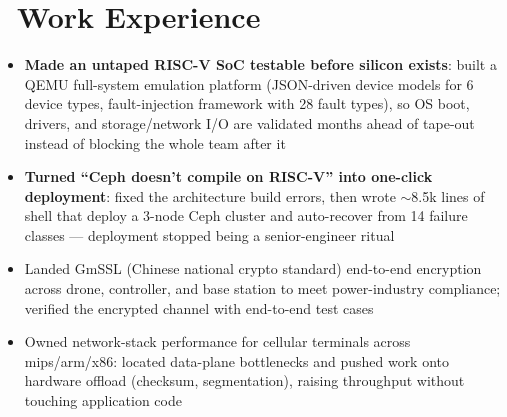 \documentclass{resume}
\begin{document}
\section{\faBriefcase\ Work Experience}
\begin{onehalfspacing}
\begin{itemize}
	\item \textbf{Made an untaped RISC-V SoC testable before silicon exists}: built a QEMU full-system emulation platform (JSON-driven device models for 6 device types, fault-injection framework with 28 fault types), so OS boot, drivers, and storage/network I/O are validated months ahead of tape-out instead of blocking the whole team after it
	\item \textbf{Turned ``Ceph doesn't compile on RISC-V'' into one-click deployment}: fixed the architecture build errors, then wrote $\sim$8.5k lines of shell that deploy a 3-node Ceph cluster and auto-recover from 14 failure classes --- deployment stopped being a senior-engineer ritual
\end{itemize}
\end{onehalfspacing}

\begin{onehalfspacing}
\begin{itemize}
	\item Landed GmSSL (Chinese national crypto standard) end-to-end encryption across drone, controller, and base station to meet power-industry compliance; verified the encrypted channel with end-to-end test cases
\end{itemize}
\end{onehalfspacing}

\begin{onehalfspacing}
\begin{itemize}
	\item Owned network-stack performance for cellular terminals across mips/arm/x86: located data-plane bottlenecks and pushed work onto hardware offload (checksum, segmentation), raising throughput without touching application code
\end{itemize}
\end{onehalfspacing}
\end{document}
